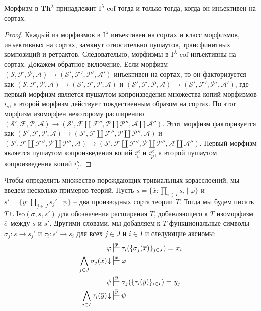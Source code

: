 \documentclass[reqno]{amsart}
\theoremstyle{definition}
\theoremstyle{remark}
\newcommand{\bcat}[1]{\mathbf{#1}}
\newcommand{\fs}[1]{\mathrm{#1}}
\newcommand{\Th}{\bcat{Th}}
\newcommand{\I}{\mathrm{I}}
\newcommand{\class}[2]{#1\text{-}\mathrm{#2}}
\newcommand{\Icof}[1][\I]{\class{#1}{cof}}
\begin{document}
\begin{prop}[th-cof]
Морфизм в $\Th^\lambda$ принадлежит $\Icof[\I^\lambda]$ тогда и только тогда, когда он инъективен на сортах.
\end{prop}
\begin{proof}
Каждый из морфизмов в $\I^\lambda$ инъективен на сортах и класс морфизмов, инъективных на сортах, замкнут относительно пушаутов, трансфинитных композиций и ретрактов.
Следовательно, морфизмы в $\Icof[\I^\lambda]$ инъективны на сортах.
Докажем обратное включение.
Если морфизм $(\mathcal{S},\mathcal{F},\mathcal{P},\mathcal{A}) \to (\mathcal{S}',\mathcal{F}',\mathcal{P}',\mathcal{A}')$ инъективен на сортах,
то он факторизуется как $(\mathcal{S},\mathcal{F},\mathcal{P},\mathcal{A}) \to (\mathcal{S}',\mathcal{F},\mathcal{P},\mathcal{A})$ и $(\mathcal{S}',\mathcal{F},\mathcal{P},\mathcal{A}) \to (\mathcal{S}',\mathcal{F}',\mathcal{P}',\mathcal{A}')$,
где первый морфизм является пушаутом копроизведения множества копий морфизмов $i_s$, а второй морфизм действует тождественным образом на сортах.
По  этот морфизм изоморфен некоторому расширению $(\mathcal{S}',\mathcal{F},\mathcal{P},\mathcal{A}) \to (\mathcal{S}', \mathcal{F} \amalg \mathcal{F}'', \mathcal{P} \amalg \mathcal{P}'', \mathcal{A} \amalg \mathcal{A}'')$.
Этот морфизм факторизуется как $(\mathcal{S}',\mathcal{F},\mathcal{P},\mathcal{A}) \to (\mathcal{S}', \mathcal{F} \amalg \mathcal{F}'', \mathcal{P} \amalg \mathcal{P}'', \mathcal{A})$ и
$(\mathcal{S}', \mathcal{F} \amalg \mathcal{F}'', \mathcal{P} \amalg \mathcal{P}'', \mathcal{A}) \to (\mathcal{S}', \mathcal{F} \amalg \mathcal{F}'', \mathcal{P} \amalg \mathcal{P}'', \mathcal{A} \amalg \mathcal{A}'')$.
Первый морфизм является пушаутом копроизведения копий $i_t^\kappa$ и $i_p^\kappa$, а второй пушаутом копроизведения копий $i_f^\kappa$.
\end{proof}

Чтобы определить множество порождающих тривиальных корасслоений, мы введем несколько примеров теорий.
Пусть $s = \{ \overline{x} : \prod_{i \in I} s_i \mid \varphi \}$ и $s' = \{ \overline{y} : \prod_{j \in J} s_j' \mid \psi \}$ -- два производных сорта теории $T$.
Тогда мы будем писать $T \cup \fs{Iso}(\overline{\sigma},s,s')$ для обозначения расширения $T$, добавляющего к $T$ изоморфизм $\overline{\sigma}$ между $s$ и $s'$.
Другими словами, мы добавляем к $T$ функциональные символы $\sigma_j : s \to s_j'$ и $\tau_i : s' \to s_i$ для всех $j \in J$ и $i \in I$ и следующие аксиомы:
\begin{align*}
\varphi & \sststile{}{\overline{x}} \tau_i(\{ \sigma_j(\overline{x}) \}_{j \in J}) = x_i \\
\bigwedge_{j \in J} \sigma_j(\overline{x})\!\downarrow & \sststile{}{\overline{x}} \varphi \\
\psi & \sststile{}{\overline{y}} \sigma_j(\{ \tau_i(\overline{y}) \}_{i \in I}) = y_j \\
\bigwedge_{i \in I} \tau_i(\overline{y})\!\downarrow & \sststile{}{\overline{y}} \psi
\end{align*}
\end{document}

